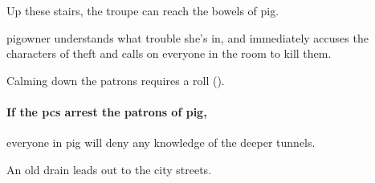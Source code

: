 Up these stairs, the troupe can reach the bowels of \gls{pig}.

\Gls{pigowner} understands what trouble she's in, and immediately accuses the characters of theft and calls on everyone in the room to kill them.

Calming down the patrons requires a  roll (\tn[10]).

\paragraph{If the \glspl{pc} arrest the patrons of \gls{pig},}
everyone in \gls{pig} will deny any knowledge of the deeper tunnels.

\label{slum_exit}

An old drain leads out to the city streets.

